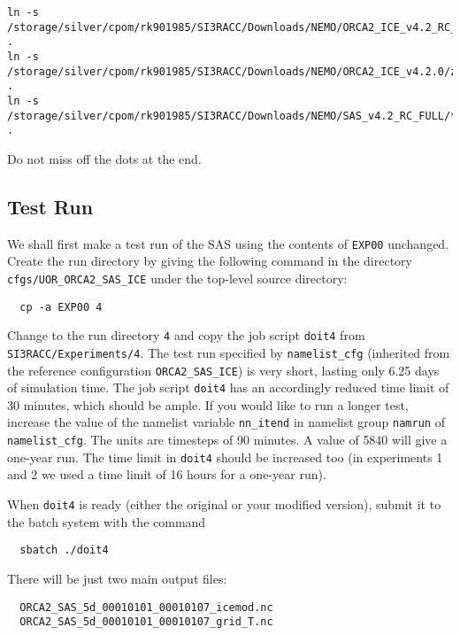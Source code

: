 \begin{verbatim}
ln -s /storage/silver/cpom/rk901985/SI3RACC/Downloads/NEMO/ORCA2_ICE_v4.2_RC_FULL/* .
ln -s /storage/silver/cpom/rk901985/SI3RACC/Downloads/NEMO/ORCA2_ICE_v4.2.0/zdfiwm_*.nc .
ln -s /storage/silver/cpom/rk901985/SI3RACC/Downloads/NEMO/SAS_v4.2_RC_FULL/* .
\end{verbatim}

\noindent{}Do not miss off the dots at the end.


\subsection{Test Run}
\label{sec:sas:subsec:test-run}

We shall first make a test run of the SAS using the contents of \verb|EXP00| unchanged.
Create the run directory by giving the following command in the directory \verb|cfgs/UOR_ORCA2_SAS_ICE| under the top-level source directory:

\begin{verbatim}
  cp -a EXP00 4
\end{verbatim}

\noindent{}Change to the run directory \verb|4| and copy the job script \verb|doit4| from \verb|SI3RACC/|\linebreak\verb|Experiments/4|.
The test run specified by \verb|namelist_cfg| (inherited from the reference configuration \verb|ORCA2_SAS_ICE|) is very short, lasting only 6.25 days of simulation time.
The job script \verb|doit4| has an accordingly reduced time limit of 30 minutes, which should be ample.
If you would like to run a longer test, increase the value of the namelist variable \verb|nn_itend| in namelist group \verb|namrun| of \verb|namelist_cfg|.
The units are timesteps of 90 minutes.
A value of 5840 will give a one-year run.
The time limit in \verb|doit4| should be increased too (in experiments 1 and 2 we used a time limit of 16 hours for a one-year run).

When \verb|doit4| is ready (either the original or your modified version), submit it to the batch system with the command

\begin{verbatim}
  sbatch ./doit4
\end{verbatim}

\noindent{}There will be just two main output files:

\begin{verbatim}
  ORCA2_SAS_5d_00010101_00010107_icemod.nc
  ORCA2_SAS_5d_00010101_00010107_grid_T.nc
\end{verbatim}

